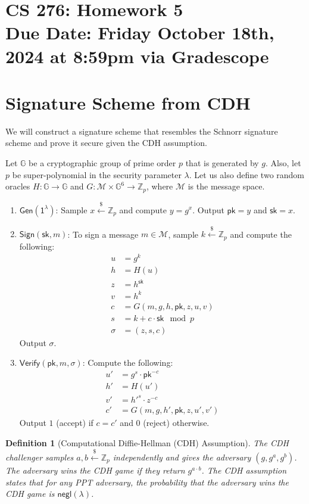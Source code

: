 \documentclass[11pt]{article}
\newtheorem{definition}[theorem]{Definition}
\numberwithin{equation}{section}
\newcommand{\Gen}{\mathsf{Gen}}
\newcommand{\Sign}{\mathsf{Sign}}
\newcommand{\Verify}{\mathsf{Verify}}
\newcommand{\pk}{\mathsf{pk}}
\newcommand{\sk}{\mathsf{sk}}
\newcommand{\secp}{\lambda}
\newcommand{\bbG}{\mathbb{G}}
\newcommand{\bbZ}{\mathbb{Z}}
\newcommand{\cM}{\mathcal{M}}
\newcommand{\negl}{\mathsf{negl}}
\newcommand{\getsr}{\stackrel{\$}{\gets}}
\newcommand{\duedate}{Friday October 18th, 2024 at 8:59pm via Gradescope}
\begin{document}
\section*{CS 276: Homework 5\\ {\small Due Date: \duedate} }


\section{Signature Scheme from CDH}
We will construct a signature scheme that resembles the Schnorr signature scheme and prove it secure given the CDH assumption.

Let $\bbG$ be a cryptographic group of prime order $p$ that is generated by $g$. Also, let $p$ be super-polynomial in the security parameter $\secp$. Let us also define two random oracles $H:\bbG \to \bbG$ and $G:\cM \times \bbG^6 \to \bbZ_p$, where $\cM$ is the message space.
\begin{enumerate}
    \item $\mathsf{\Gen(1^\secp)}$: Sample $x \getsr \bbZ_p$ and compute $y = g^x$. Output $\pk = y$ and $\sk = x$.
    \item $\Sign(\sk, m)$: To sign a message $m \in \cM$, sample $k \getsr \bbZ_p$ and compute the following:
    \begin{align*}
        u &= g^k\\
        h &= H(u)\\
        z &= h^\sk\\
        v &= h^k\\
        c &= G(m, g, h, \pk, z, u, v)\\
        s &= k + c \cdot \sk \mod p\\
        \sigma &= (z, s, c)
    \end{align*}
    Output $\sigma$.
    \item $\Verify(\pk, m, \sigma)$: Compute the following:
    \begin{align*}
        u' &= g^s \cdot \pk^{-c}\\
        h' &= H(u')\\
        v' &= h'^s \cdot z^{-c}\\
        c' &= G(m, g, h', \pk, z, u', v')
    \end{align*}
    Output $1$ (accept) if $c = c'$ and $0$ (reject) otherwise.
\end{enumerate}

\begin{definition}[Computational Diffie-Hellman (CDH) Assumption]
The CDH challenger samples $a, b \getsr \bbZ_p$ independently and gives the adversary $(g, g^a, g^b)$. The adversary wins the CDH game if they return $g^{a \cdot b}$. The CDH assumption states that for any PPT adversary, the probability that the adversary wins the CDH game is $\negl(\secp)$.
\end{definition}
\end{document}

